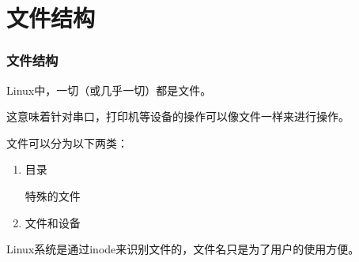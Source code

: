 \documentclass{beamer}
\begin{document}
\section{文件结构} %
\begin{frame}
\frametitle{文件结构}
Linux中，一切（或几乎一切）都是文件。

这意味着针对串口，打印机等设备的操作可以像文件一样来进行操作。

文件可以分为以下两类：
\begin{enumerate}
\item
目录

特殊的文件
\item
文件和设备
\end{enumerate}
Linux系统是通过inode来识别文件的，文件名只是为了用户的使用方便。
\end{frame}
\end{document}
